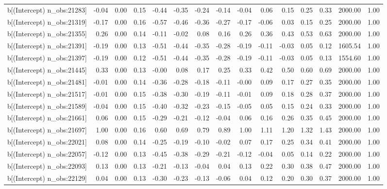 \begin{table}[ht]
\begin{tabular}{rrrrrrrrrrrrrrr}
  b[(Intercept) n\_obs:21283] & -0.04 & 0.00 & 0.15 & -0.44 & -0.35 & -0.24 & -0.14 & -0.04 & 0.06 & 0.15 & 0.25 & 0.33 & 2000.00 & 1.00 \\ 
  b[(Intercept) n\_obs:21319] & -0.17 & 0.00 & 0.16 & -0.57 & -0.46 & -0.36 & -0.27 & -0.17 & -0.06 & 0.03 & 0.15 & 0.25 & 2000.00 & 1.00 \\ 
  b[(Intercept) n\_obs:21355] & 0.26 & 0.00 & 0.14 & -0.11 & -0.02 & 0.08 & 0.16 & 0.26 & 0.36 & 0.43 & 0.53 & 0.63 & 2000.00 & 1.00 \\ 
  b[(Intercept) n\_obs:21391] & -0.19 & 0.00 & 0.13 & -0.51 & -0.44 & -0.35 & -0.28 & -0.19 & -0.11 & -0.03 & 0.05 & 0.12 & 1605.54 & 1.00 \\ 
  b[(Intercept) n\_obs:21397] & -0.19 & 0.00 & 0.12 & -0.51 & -0.44 & -0.35 & -0.28 & -0.19 & -0.11 & -0.03 & 0.05 & 0.13 & 1554.60 & 1.00 \\ 
  b[(Intercept) n\_obs:21445] & 0.33 & 0.00 & 0.13 & -0.00 & 0.08 & 0.17 & 0.25 & 0.33 & 0.42 & 0.50 & 0.60 & 0.69 & 2000.00 & 1.00 \\ 
  b[(Intercept) n\_obs:21481] & -0.01 & 0.00 & 0.14 & -0.36 & -0.28 & -0.18 & -0.11 & -0.00 & 0.09 & 0.17 & 0.27 & 0.35 & 2000.00 & 1.00 \\ 
  b[(Intercept) n\_obs:21517] & -0.01 & 0.00 & 0.15 & -0.38 & -0.30 & -0.19 & -0.11 & -0.01 & 0.09 & 0.18 & 0.28 & 0.37 & 2000.00 & 1.00 \\ 
  b[(Intercept) n\_obs:21589] & -0.04 & 0.00 & 0.15 & -0.40 & -0.32 & -0.23 & -0.15 & -0.05 & 0.05 & 0.15 & 0.24 & 0.33 & 2000.00 & 1.00 \\ 
  b[(Intercept) n\_obs:21661] & 0.06 & 0.00 & 0.15 & -0.29 & -0.21 & -0.12 & -0.04 & 0.06 & 0.16 & 0.26 & 0.35 & 0.45 & 2000.00 & 1.00 \\ 
  b[(Intercept) n\_obs:21697] & 1.00 & 0.00 & 0.16 & 0.60 & 0.69 & 0.79 & 0.89 & 1.00 & 1.11 & 1.20 & 1.32 & 1.43 & 2000.00 & 1.00 \\ 
  b[(Intercept) n\_obs:22021] & 0.08 & 0.00 & 0.14 & -0.25 & -0.19 & -0.10 & -0.02 & 0.07 & 0.17 & 0.25 & 0.34 & 0.41 & 2000.00 & 1.00 \\ 
  b[(Intercept) n\_obs:22057] & -0.12 & 0.00 & 0.13 & -0.45 & -0.38 & -0.29 & -0.21 & -0.12 & -0.04 & 0.05 & 0.14 & 0.22 & 2000.00 & 1.00 \\ 
  b[(Intercept) n\_obs:22093] & 0.13 & 0.00 & 0.13 & -0.21 & -0.13 & -0.04 & 0.04 & 0.13 & 0.22 & 0.30 & 0.38 & 0.47 & 2000.00 & 1.00 \\ 
  b[(Intercept) n\_obs:22129] & 0.04 & 0.00 & 0.13 & -0.30 & -0.23 & -0.13 & -0.06 & 0.04 & 0.12 & 0.20 & 0.30 & 0.37 & 2000.00 & 1.00 \\ 

\end{tabular}
\end{table}
